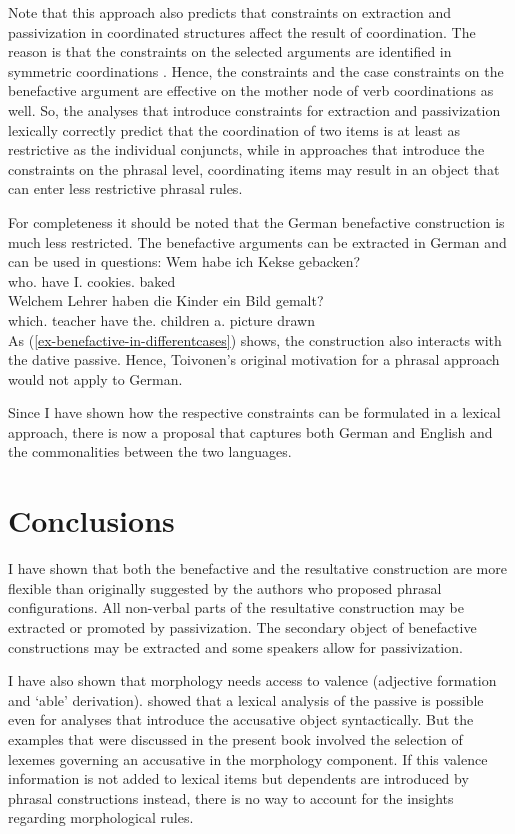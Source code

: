Note that this approach also predicts that constraints on extraction and passivization in
coordinated structures affect the result of coordination. The reason is that the constraints on the
selected arguments are identified in symmetric coordinations \citep[]{ps2}. Hence, the \slasch constraints and the
case constraints on the benefactive argument are effective on the mother node of verb coordinations
as well. So, the analyses that introduce constraints for extraction and passivization lexically
correctly predict that the coordination of two items is at least as restrictive as the individual
conjuncts, while in approaches that introduce the constraints on the phrasal level, coordinating
items may result in an object that can enter less restrictive phrasal rules.


For completeness it should be noted that the German benefactive construction is much less
restricted. The benefactive arguments can be extracted in German and can be used in questions:
\eal
\ex 
\gll Wem habe ich Kekse gebacken?\\
     who.\dat{} have I.\nom{} cookies.\acc{} baked\\
\ex 
\gll Welchem Lehrer haben die Kinder ein Bild gemalt?\\
     which.\dat{} teacher have the.\nom{} children a.\acc{} picture drawn\\
\zl
As (\ref{ex-benefactive-in-differentcases}) shows, the construction also interacts with the dative
passive. Hence, Toivonen's original motivation for a phrasal approach would not apply to
German. 

Since I have shown how the respective constraints can be formulated in a lexical approach,
there is now a proposal that captures both German and English and the commonalities between the two languages.


\chapter{Conclusions}
\label{sec-conclusions}

I have shown that both the benefactive and the resultative construction are more
flexible than originally suggested by the authors who proposed phrasal configurations. All
non-verbal parts of the resultative construction may be extracted or promoted by passivization. The
secondary object of benefactive constructions may be extracted and some speakers allow for
passivization.
 
I have also shown that morphology needs access to valence (adjective formation and 
`able' derivation). \citet{Alsina96a} showed that a lexical analysis of the passive is possible even
for analyses that introduce the accusative object syntactically. But the examples that were
discussed in the present book involved the selection of lexemes governing an accusative in the
morphology component. If this valence information is not added to lexical items but dependents are introduced by phrasal
constructions instead, there is no way to account for the insights regarding morphological rules.

